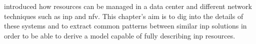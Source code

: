  introduced how resources can be managed in a data center and different network techniques such as \gls{inp} and \gls{nfv}.
This chapter's aim is to dig into the details of these systems and to extract common patterns between similar \gls{inp} solutions in order to be able to derive a model capable of fully describing \gls{inp} resources.